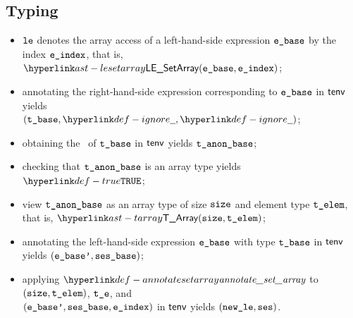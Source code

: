 \subsection{Typing}
\ProseParagraph
\AllApply
\begin{itemize}
  \item $\vle$ denotes the array access of a left-hand-side expression $\ebase$ by the index $\eindex$, that is, $\LESetArray(\ebase, \eindex)$;
  \item annotating the right-hand-side expression corresponding to $\ebase$ in $\tenv$ yields \\ $(\tbase, \Ignore, \Ignore)$\ProseOrTypeError;
  \item obtaining the \underlyingtype\ of $\tbase$ in $\tenv$ yields $\tanonbase$\ProseOrTypeError;
  \item checking that $\tanonbase$ is an array type yields $\True$\ProseOrTypeError;
  \item view $\tanonbase$ as an array type of size $\size$ and element type $\telem$, that is, $\TArray(\size, \telem)$;
  \item annotating the left-hand-side expression $\ebase$ with type $\tbase$ in $\tenv$ yields $(\ebasep, \vsesbase)$\ProseOrTypeError;
  \item applying $\annotatesetarray$ to $(\size, \telem)$, $\vte$, and \\
        $(\ebasep, \vsesbase, \eindex)$ in $\tenv$ yields $(\newle, \vses)$\ProseOrTypeError.
\end{itemize}

\FormallyParagraph
\begin{mathpar}
\end{mathpar}

